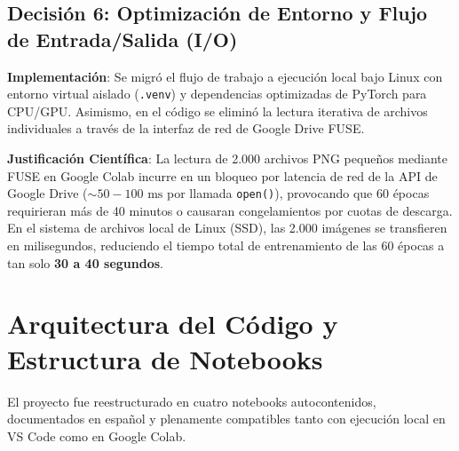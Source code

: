 \documentclass[11pt,a4paper]{article}
\begin{document}
\subsection{Decisión 6: Optimización de Entorno y Flujo de Entrada/Salida (I/O)}
\textbf{Implementación}: Se migró el flujo de trabajo a ejecución local bajo Linux con entorno virtual aislado (\texttt{.venv}) y dependencias optimizadas de PyTorch para CPU/GPU. Asimismo, en el código se eliminó la lectura iterativa de archivos individuales a través de la interfaz de red de Google Drive FUSE.

\textbf{Justificación Científica}: La lectura de 2.000 archivos PNG pequeños mediante FUSE en Google Colab incurre en un bloqueo por latencia de red de la API de Google Drive ($\sim 50-100\text{ ms}$ por llamada \texttt{open()}), provocando que 60 épocas requirieran más de 40 minutos o causaran congelamientos por cuotas de descarga. En el sistema de archivos local de Linux (SSD), las 2.000 imágenes se transfieren en milisegundos, reduciendo el tiempo total de entrenamiento de las 60 épocas a tan solo \textbf{30 a 40 segundos}.

\section{Arquitectura del Código y Estructura de Notebooks}

El proyecto fue reestructurado en cuatro notebooks autocontenidos, documentados en español y plenamente compatibles tanto con ejecución local en VS Code como en Google Colab.
\end{document}
